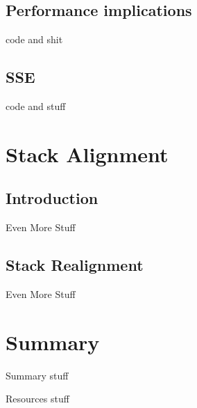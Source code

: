 \documentclass{beamer}
\begin{document}
\subsection{Performance implications}
\begin{frame}{\insertsection}{\insertsubsection}
	code and shit
\end{frame}

\subsection{SSE}
\begin{frame}{\insertsection}{\insertsubsection}
	code and stuff
\end{frame}

\section{Stack Alignment}
\subsection{Introduction}
\begin{frame}{\insertsection}{\insertsubsection}
	Even More Stuff
\end{frame}

\subsection{Stack Realignment}
\begin{frame}{\insertsection}{\insertsubsection}
	Even More Stuff
\end{frame}

\section{Summary}
\begin{frame}{\insertsection}{\insertsubsection}
	Summary stuff
\end{frame}

\begin{frame}{Resources}
	stuff
\end{frame}
\end{document}
